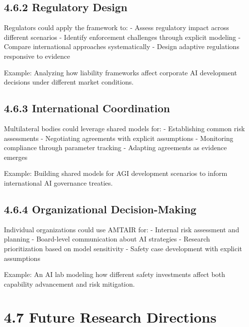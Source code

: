 \documentclass[
  11pt,
  letterpaper,
]{book}
\begin{document}
\subsection*{4.6.2 Regulatory Design}\label{sec-regulatory-integration}

Regulators could apply the framework to: - Assess regulatory impact
across different scenarios - Identify enforcement challenges through
explicit modeling - Compare international approaches systematically -
Design adaptive regulations responsive to evidence

Example: Analyzing how liability frameworks affect corporate AI
development decisions under different market conditions.

\subsection*{4.6.3 International
Coordination}\label{sec-international-integration}

Multilateral bodies could leverage shared models for: - Establishing
common risk assessments - Negotiating agreements with explicit
assumptions - Monitoring compliance through parameter tracking -
Adapting agreements as evidence emerges

Example: Building shared models for AGI development scenarios to inform
international AI governance treaties.

\subsection*{4.6.4 Organizational
Decision-Making}\label{sec-organizational-integration}

Individual organizations could use AMTAIR for: - Internal risk
assessment and planning - Board-level communication about AI strategies
- Research prioritization based on model sensitivity - Safety case
development with explicit assumptions

Example: An AI lab modeling how different safety investments affect both
capability advancement and risk mitigation.

\section*{4.7 Future Research Directions}\label{sec-future-research}
\end{document}
